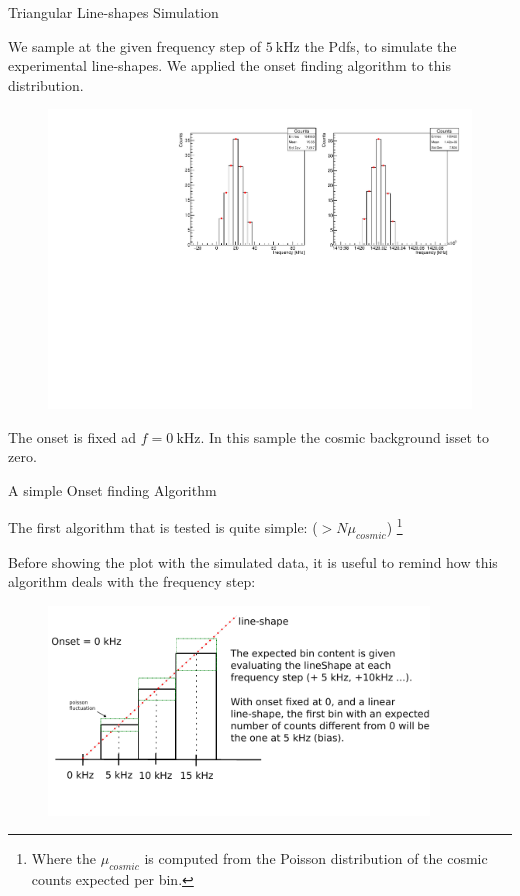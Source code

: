 \documentclass[8pt]{beamer}
\begin{document}
\begin{frame}{Triangular Line-shapes Simulation}

We sample at the given frequency step of $\SI{5}{ \kilo \hertz}$ the Pdfs, to simulate the experimental line-shapes. We applied the onset finding algorithm to this distribution.
 
\begin{figure}
\includegraphics[width = \textwidth]{TriangleLineShape.pdf}
\end{figure}

The onset is fixed ad $f = \SI{0}{\kilo \hertz}$. In this sample the cosmic background is\newline set to zero.

\end{frame}

\begin{frame}{A simple Onset finding Algorithm}

The first algorithm that is tested is quite simple: { ($> N\mu_{cosmic}$)} \footnote{Where the $\mu_{cosmic}$ is computed from the Poisson distribution of the cosmic counts expected per bin.}

Before showing the plot with the simulated data, it is useful to remind how this algorithm deals with the frequency step:

\begin{figure}
\includegraphics[width = 0.9\textwidth]{ExplainingAlgorithm1.pdf}
\end{figure}
\end{frame}
\end{document}
